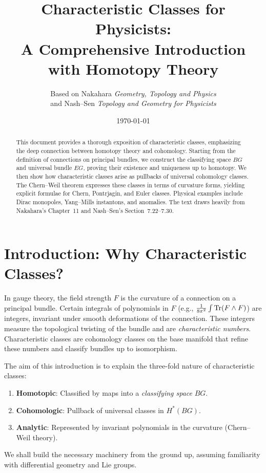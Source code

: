 \documentclass[11pt]{article}
\title{\bfseries Characteristic Classes for Physicists: \\
A Comprehensive Introduction with Homotopy Theory}
\author{Based on Nakahara \textit{Geometry, Topology and Physics} \\
and Nash--Sen \textit{Topology and Geometry for Physicists}}
\date{\today}
\begin{document}
\maketitle

\begin{abstract}
This document provides a thorough exposition of characteristic classes, emphasizing the deep connection between homotopy theory and cohomology. Starting from the definition of connections on principal bundles, we construct the classifying space \(BG\) and universal bundle \(EG\), proving their existence and uniqueness up to homotopy. We then show how characteristic classes arise as pullbacks of universal cohomology classes. The Chern--Weil theorem expresses these classes in terms of curvature forms, yielding explicit formulae for Chern, Pontrjagin, and Euler classes. Physical examples include Dirac monopoles, Yang--Mills instantons, and anomalies. The text draws heavily from Nakahara's Chapter~11 and Nash--Sen's Section~7.22--7.30.
\end{abstract}

\tableofcontents

\section{Introduction: Why Characteristic Classes?}
In gauge theory, the field strength \(F\) is the curvature of a connection on a principal bundle. Certain integrals of polynomials in \(F\) (e.g., \(\frac{1}{8\pi^2}\int \Tr(F\wedge F)\)) are integers, invariant under smooth deformations of the connection. These integers measure the topological twisting of the bundle and are \emph{characteristic numbers}. Characteristic classes are cohomology classes on the base manifold that refine these numbers and classify bundles up to isomorphism. 

The aim of this introduction is to explain the three-fold nature of characteristic classes:
\begin{enumerate}
    \item \textbf{Homotopic}: Classified by maps into a \emph{classifying space} \(BG\).
    \item \textbf{Cohomologic}: Pullback of universal classes in \(H^*(BG)\).
    \item \textbf{Analytic}: Represented by invariant polynomials in the curvature (Chern--Weil theory).
\end{enumerate}
We shall build the necessary machinery from the ground up, assuming familiarity with differential geometry and Lie groups.
\end{document}
